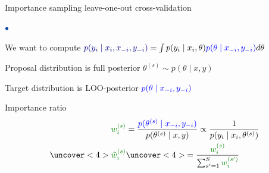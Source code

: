 \documentclass[english,t]{beamer}
\newenvironment{list1}{
   \begin{list}{$\color{list1}\bullet$}{\itemsep=6pt}}{
  \end{list}}
\begin{document}
\begin{frame}{Importance sampling leave-one-out cross-validation}

  \begin{list1}
  \item We want to compute ${\color{navyblue}p(y_i \mid x_i,x_{-i}, y_{-i})} = \int p(y_i \mid x_i,\theta){\color{blue} p(\theta \mid x_{-i}, y_{-i})} d\theta$
  \item<2-> Proposal distribution is full posterior $\theta^{(s)} \sim p(\theta \mid x,y)$
  \item<2-> Target distribution is LOO-posterior ${\color{blue} p(\theta \mid x_{-i}, y_{-i})}$
  \item<3-> Importance ratio
    \begin{align*}
    {\color{darkgreen} w_i^{(s)}} & = \frac{{\color{blue} p(\theta^{(s)} \mid x_{-i}, y_{-i})}}{p(\theta^{(s)} \mid x,y)}\propto \frac{1}{p(y_i \mid x_i,\theta^{(s)})}\\
      \uncover<4>{\color{darkgreen}\tilde{w}_i^{(s)}}&\uncover<4>{=\frac{{\color{darkgreen} w_i^{(s)}}}{\sum_{s'=1}^S {\color{darkgreen} w_i^{(s')}}}}
    \end{align*}
  \end{list1}

\end{frame}
\end{document}
